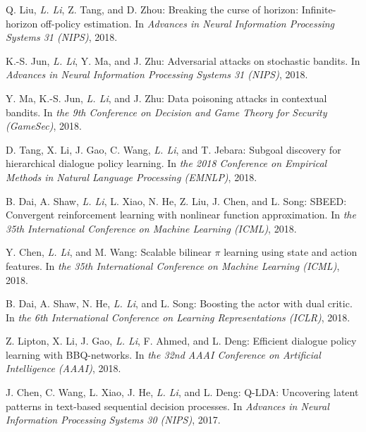 \documentclass[10pt,twoside,letterpaper]{article}
\newcommand{\selffont}[1]{{\textit{#1}}}
\newcommand{\venuefont}[1]{{\textit{#1}}}
\newcommand{\myself}{\selffont{L. Li}}
\begin{document}
\begin{compactenum}[(C1)]

\item{Q. Liu, \myself, Z. Tang, and D. Zhou: Breaking the curse of horizon: Infinite-horizon off-policy estimation.  In \venuefont{Advances in Neural Information Processing Systems 31 (NIPS)}, 2018.}

\item{K.-S. Jun, \myself, Y. Ma, and J. Zhu: Adversarial attacks on stochastic bandits.  In \venuefont{Advances in Neural Information Processing Systems 31 (NIPS)}, 2018.}

\item{Y. Ma, K.-S. Jun, \myself, and J. Zhu: Data poisoning attacks in contextual bandits. In \venuefont{the 9th Conference on Decision and Game Theory for Security (GameSec)}, 2018.}

\item{D. Tang, X. Li, J. Gao, C. Wang, \myself, and T. Jebara: Subgoal discovery for hierarchical dialogue policy learning. In \venuefont{the 2018 Conference on Empirical Methods in Natural Language Processing (EMNLP)}, 2018.}

\item{B. Dai, A. Shaw, \myself, L. Xiao, N. He, Z. Liu, J. Chen, and L. Song: SBEED: Convergent reinforcement learning with nonlinear function approximation.  In \venuefont{the 35th International Conference on Machine Learning (ICML)}, 2018.}

\item{Y. Chen, \myself, and M. Wang: Scalable bilinear $\pi$ learning using state and action features.  In \venuefont{the 35th International Conference on Machine Learning (ICML)}, 2018.}

\item{B. Dai, A. Shaw, N. He, \myself, and L. Song: Boosting the actor with dual critic. In \venuefont{the 6th International Conference on Learning Representations (ICLR)}, 2018.}

\item{Z. Lipton, X. Li, J. Gao, \myself, F. Ahmed, and L. Deng: Efficient dialogue policy learning with BBQ-networks.  In \venuefont{the 32nd AAAI Conference on Artificial Intelligence (AAAI)}, 2018.}

\item{J. Chen, C. Wang, L. Xiao, J. He, \myself, and L. Deng: Q-LDA: Uncovering latent patterns in text-based sequential decision processes. In \venuefont{Advances in Neural Information Processing Systems 30 (NIPS)}, 2017.}


\end{compactenum}
\end{document}
